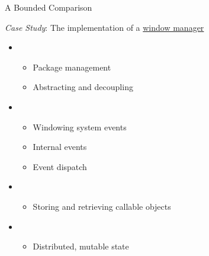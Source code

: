 \begin{secframe}{A Bounded Comparison}

    \textit{Case Study}: The implementation of a \underline{window manager}

    \begin{itemize}
        \item {}\\
            \begin{itemize}
                \item Package management
                \item Abstracting and decoupling
            \end{itemize}

        \item {}\\
            \begin{itemize}
                \item Windowing system events
                \item Internal events
                \item Event dispatch
            \end{itemize}

        \item {}\\
            \begin{itemize}
                \item Storing and retrieving callable objects
            \end{itemize}

        \item {}\\
            \begin{itemize}
                \item Distributed, mutable state
            \end{itemize}
    \end{itemize}

    \vfill

\end{secframe}

